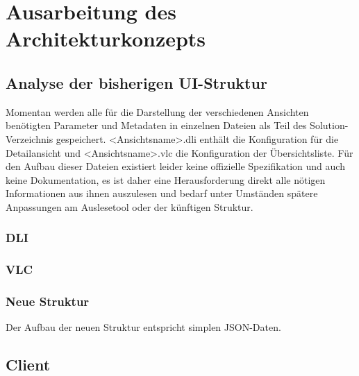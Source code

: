 \chapter{Ausarbeitung des Architekturkonzepts}\label{chap:concept}
\section{Analyse der bisherigen UI-Struktur}
Momentan werden alle für die Darstellung der verschiedenen Ansichten benötigten Parameter und Metadaten in einzelnen Dateien als Teil des Solution-Verzeichnis gespeichert. <Ansichtsname>.dli enthält die Konfiguration für die Detailansicht und <Ansichtsname>.vlc die Konfiguration der Übersichtsliste. Für den Aufbau dieser Dateien existiert leider keine offizielle Spezifikation und auch keine Dokumentation, es ist daher eine Herausforderung direkt alle nötigen Informationen aus ihnen auszulesen und bedarf unter Umständen spätere Anpassungen am Auslesetool oder der künftigen Struktur.

\subsection{DLI}
\subsection{VLC}
\subsection{Neue Struktur}
Der Aufbau der neuen Struktur entspricht simplen JSON-Daten. 

\section{Client}

